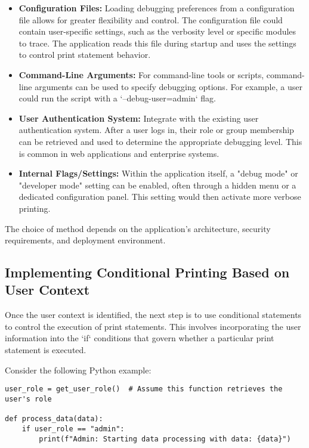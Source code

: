 \documentclass{article}
\begin{document}
{{{\begin{itemize}
    \item \textbf{Configuration Files:}  Loading debugging preferences from a configuration file allows for greater flexibility and control.  The configuration file could contain user-specific settings, such as the verbosity level or specific modules to trace.  The application reads this file during startup and uses the settings to control print statement behavior.

    \item \textbf{Command-Line Arguments:} For command-line tools or scripts, command-line arguments can be used to specify debugging options.  For example, a user could run the script with a `--debug-user=admin` flag.

    \item \textbf{User Authentication System:} Integrate with the existing user authentication system.  After a user logs in, their role or group membership can be retrieved and used to determine the appropriate debugging level.  This is common in web applications and enterprise systems.

    \item \textbf{Internal Flags/Settings:}  Within the application itself, a "debug mode" or "developer mode" setting can be enabled, often through a hidden menu or a dedicated configuration panel.  This setting would then activate more verbose printing.
\end{itemize}

The choice of method depends on the application's architecture, security requirements, and deployment environment.

\subsection*{Implementing Conditional Printing Based on User Context}

Once the user context is identified, the next step is to use conditional statements to control the execution of print statements.  This involves incorporating the user information into the `if` conditions that govern whether a particular print statement is executed.

Consider the following Python example:

\begin{verbatim}
user_role = get_user_role()  # Assume this function retrieves the user's role

def process_data(data):
    if user_role == "admin":
        print(f"Admin: Starting data processing with data: {data}")


\end{verbatim}}}}
\end{document}
